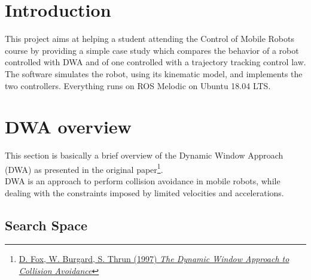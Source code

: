 \documentclass[11pt,a4paper]{article}
\begin{document}


\newpage

\renewcommand*\contentsname{Table of Contents}
\tableofcontents

\newpage




\section{Introduction}

This project aims at helping a student attending the Control of Mobile Robots course by providing a simple case study which compares the behavior of a robot controlled with DWA and of one controlled with a trajectory tracking control law.\\

The software simulates the robot, using its kinematic model, and implements the two controllers. Everything runs on ROS Melodic on Ubuntu 18.04 LTS.




\section{DWA overview}

This section is basically a brief overview of the Dynamic Window Approach (DWA) as presented in the original paper\footnote{\href{https://www.ri.cmu.edu/pub_files/pub1/fox_dieter_1997_1/fox_dieter_1997_1.pdf}{D. Fox, W. Burgard, S. Thrun (1997) \textit{The Dynamic Window Approach to Collision Avoidance}}}.\\

DWA is an approach to perform collision avoidance in mobile robots, while dealing with the constraints imposed by limited velocities and accelerations.

\subsection{Search Space}
\end{document}

